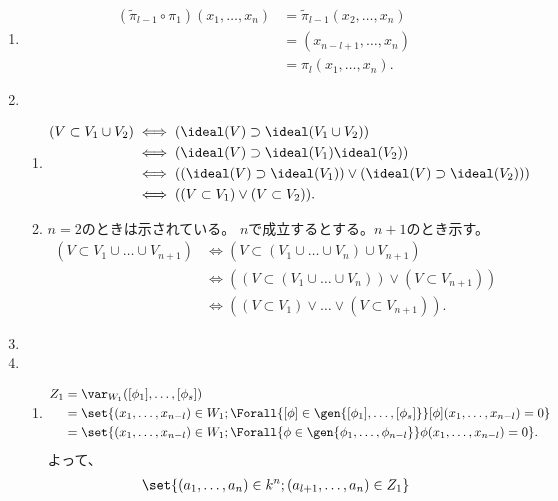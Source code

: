 \begin{enumerate}[label=(\arabic*)]
\begin{enumerate}[label=(\alph*)]
  \end{enumerate}
  \item
  \begin{align}
    (\tilde \pi_{l-1} \circ \pi_1)(x_1,\dots,x_n)
    &=
    \tilde \pi_{l-1}(x_2,\dots,x_n)\\
    &=
    (x_{n-l+1},\dots,x_n)\\
    &=
    \pi_l (x_1,\dots,x_n).
  \end{align}
  \item
  \begin{enumerate}[label=(\alph*)]
    \item
  \begin{align}
    (V \subset V_1\cup V_2)
    &\iff
     (\ideal(V) \supset \ideal(V_1 \cup V_2))\\
     &\iff
     (\ideal (V) \supset \ideal(V_1) \ideal(V_2))\\
     &\iff
     ((\ideal (V) \supset \ideal(V_1)) \vee (\ideal(V)\supset \ideal(V_2)))\\
     &\iff
     ((V\subset V_1)\vee (V\subset V_2)).
  \end{align}
  \item
  $n=2$のときは示されている。
  $n$で成立するとする。$n+1$のとき示す。
  \begin{align}
    (V \subset V_1\cup \dots \cup V_{n+1})
    &\iff
    (V \subset (V_1 \cup \dots \cup V_n) \cup V_{n+1})\\
    &\iff
    ((V\subset (V_1\cup \dots \cup V_n))\vee (V\subset V_{n+1}))\\
    &\iff
    ((V\subset V_1)\vee \dots \vee (V\subset V_{n+1})).
  \end{align}
  \end{enumerate}
  \item
  \item
  \begin{enumerate}[label=(\alph*)]
    \item
    \begin{align}
      Z_1 &= \var_{W_1}([\phi_1],\dots,[\phi_s])\\
      &=
      \set{(x_1,\dots,x_{n-l})\in W_1; \Forall{[\phi] \in \gen{[\phi_1],\dots,[\phi_{s}]}} [\phi](x_1,\dots,x_{n-l}) = 0}\\
      &=
      \set{(x_1,\dots,x_{n-l})\in W_1; \Forall{\phi \in \gen{\phi_1,\dots,\phi_{n-l}}} \phi(x_1,\dots,x_{n-l}) = 0}.
    \end{align}
    よって、
    \begin{align}
      \set{(a_1,\dots,a_n)\in k^n; (a_{l+1},\dots,a_n)\in Z_1}

\end{align}
\end{enumerate}
\end{enumerate}
